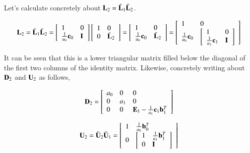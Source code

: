 Let's calculate concretely about $\mathbf{L}_2=\tilde{\mathbf{L}}_1\tilde{\mathbf{L}}_2$.

\begin{eqnarray}
\mathbf{L}_2 =
\tilde{\mathbf{L}}_1\tilde{\mathbf{L}}_2 =
\left[\begin{array}{ll}1 & 0\\ \frac{1}{a_0}\mathbf{c}_0 & \mathbf{I}\end{array}\right]
\left[\begin{array}{ll}1 & 0\\ 0 & \bar{\mathbf{L}}_2\end{array}\right] =
\left[\begin{array}{ll}1 & 0\\ \frac{1}{a_0}\mathbf{c}_0 & \bar{\mathbf{L}}_2\end{array}\right] =
\left[\begin{array}{ll}1 & 0\\ \frac{1}{a_0}\mathbf{c}_0 & \left[\begin{array}{ll}1 & 0\\ \frac{1}{a_1}\mathbf{c}_1 & \mathbf{I}\end{array}\right]  \end{array}\right]
\end{eqnarray}

It can be seen that this is a lower triangular matrix filled below the diagonal of the first two columns of the identity matrix. Likewise, concretely writing about $\mathbf{D}_2$ and $\mathbf{U}_2$ as follows,

\begin{eqnarray}
\mathbf{D}_2
 = 
 \left[\begin{array}{lll}
 a_0 & 0 & 0\\ 
 0 & a_1 & 0 \\ 
 0 & 0 & \mathbf{E}_1-\frac{1}{a_1}\mathbf{c}_1\mathbf{b}_1^T
 \end{array}\right]
\end{eqnarray}

\begin{eqnarray}
\mathbf{U}_2 
= 
\tilde{\mathbf{U}}_2\tilde{\mathbf{U}}_1 
= 
\left[\begin{array}{ll}
1 & \frac{1}{a_0}\mathbf{b}^T_0\\ 
0 & \left[\begin{array}{ll}1 & \frac{1}{a_1}\mathbf{b}^T_1\\ 0 & \mathbf{I}\end{array}\right] 
\end{array}\right]
\end{eqnarray}


